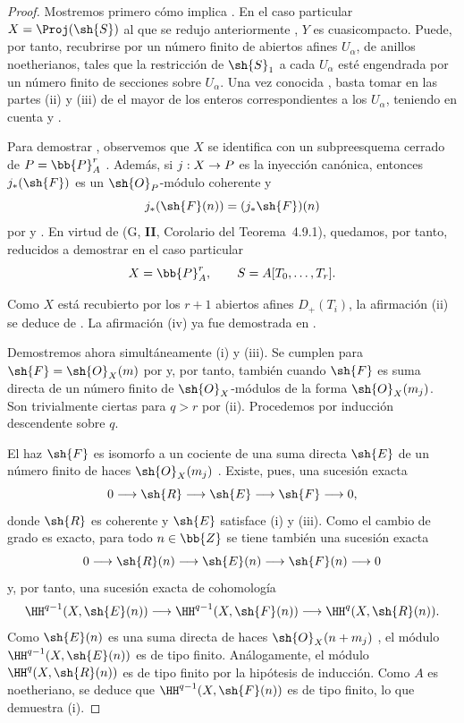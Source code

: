 \documentclass[oneside]{amsart}
\makeatletter
\newcommand{\ega@arrow}[2]{\mathchoice{#1}{#2}{#2}{#2}}
\renewcommand{\to}{\ega@arrow{\longrightarrow}{\rightarrow}}
\newcommand{\oldpage}[2][]{{\marginnote{\normalfont\textbf{#1}~|~#2}}\ignorespaces}
\makeatother
\begin{document}
\begin{proof}
Mostremos primero cómo  implica .
En el caso particular $X=\Proj(\sh{S})$ al que se redujo anteriormente , $Y$ es cuasicompacto.
Puede, por tanto, recubrirse por un número finito de abiertos afines $U_\alpha$, de anillos noetherianos, tales que la restricción de $\sh{S}_1$ a cada $U_\alpha$ esté engendrada por un número finito de secciones sobre $U_\alpha$.
Una vez conocida , basta tomar en las partes (ii) y (iii) de  el mayor de los enteros correspondientes a los $U_\alpha$, teniendo en cuenta  y .

Para demostrar , observemos que $X$ se identifica con un subpreesquema cerrado de $P=\bb{P}_A^r$ .
Además, si $j:X\to P$ es la inyección canónica, entonces $j_*(\sh{F})$ es un $\sh{O}_P$-módulo coherente y
\[
  j_*(\sh{F}(n))=(j_*\sh{F})(n)
\]
por  y .
En virtud de (G, \textbf{II}, Corolario del Teorema~4.9.1), quedamos, por tanto, reducidos a demostrar  en el caso particular
\[
  X=\bb{P}_A^r,
  \qquad S=A[T_0,\ldots,T_r].
\]

\oldpage[III]{101}

Como $X$ está recubierto por los $r+1$ abiertos afines $D_+(T_i)$, la afirmación (ii) se deduce de .
La afirmación (iv) ya fue demostrada en .

Demostremos ahora simultáneamente (i) y (iii).
Se cumplen para $\sh{F}=\sh{O}_X(m)$ por  y, por tanto, también cuando $\sh{F}$ es suma directa de un número finito de $\sh{O}_X$-módulos de la forma $\sh{O}_X(m_j)$.
Son trivialmente ciertas para $q>r$ por (ii).
Procedemos por inducción descendente sobre $q$.

El haz $\sh{F}$ es isomorfo a un cociente de una suma directa $\sh{E}$ de un número finito de haces $\sh{O}_X(m_j)$ .
Existe, pues, una sucesión exacta
\[
  0\longrightarrow\sh{R}\longrightarrow\sh{E}
   \longrightarrow\sh{F}\longrightarrow0,
\]
donde $\sh{R}$ es coherente  y $\sh{E}$ satisface (i) y (iii).
Como el cambio de grado es exacto, para todo $n\in\bb{Z}$ se tiene también una sucesión exacta
\[
  0\longrightarrow\sh{R}(n)\longrightarrow\sh{E}(n)
   \longrightarrow\sh{F}(n)\longrightarrow0
\]
y, por tanto, una sucesión exacta de cohomología
\[
  \HH^{q-1}(X,\sh{E}(n))
  \longrightarrow\HH^{q-1}(X,\sh{F}(n))
  \longrightarrow\HH^q(X,\sh{R}(n)).
\]
Como $\sh{E}(n)$ es una suma directa de haces $\sh{O}_X(n+m_j)$ , el módulo $\HH^{q-1}(X,\sh{E}(n))$ es de tipo finito.
Análogamente, el módulo $\HH^q(X,\sh{R}(n))$ es de tipo finito por la hipótesis de inducción.
Como $A$ es noetheriano, se deduce que $\HH^{q-1}(X,\sh{F}(n))$ es de tipo finito, lo que demuestra (i).


\end{proof}
\end{document}
